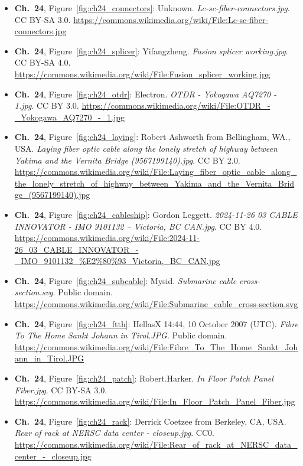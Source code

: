 \begin{small}
\begin{itemize}[leftmargin=0pt,itemsep=2pt,label={}]
\item \textbf{Ch.~24}, Figure~\ref{fig:ch24_connectors}: Unknown. \emph{Lc-\allowbreak{}sc-\allowbreak{}fiber-\allowbreak{}connectors.\allowbreak{}jpg}. CC BY-SA 3.0. \url{https://commons.wikimedia.org/wiki/File:Lc-sc-fiber-connectors.jpg}
\item \textbf{Ch.~24}, Figure~\ref{fig:ch24_splicer}: Yifangzheng. \emph{Fusion splicer working.\allowbreak{}jpg}. CC BY-SA 4.0. \url{https://commons.wikimedia.org/wiki/File:Fusion_splicer_working.jpg}
\item \textbf{Ch.~24}, Figure~\ref{fig:ch24_otdr}: Electron. \emph{OTDR -\allowbreak{} Yokogawa AQ7270 -\allowbreak{} 1.\allowbreak{}jpg}. CC BY 3.0. \url{https://commons.wikimedia.org/wiki/File:OTDR_-_Yokogawa_AQ7270_-_1.jpg}
\item \textbf{Ch.~24}, Figure~\ref{fig:ch24_laying}: Robert Ashworth from Bellingham, WA., USA. \emph{Laying fiber optic cable along the lonely stretch of highway between Yakima and the Vernita Bridge (9567199140).\allowbreak{}jpg}. CC BY 2.0. \url{https://commons.wikimedia.org/wiki/File:Laying_fiber_optic_cable_along_the_lonely_stretch_of_highway_between_Yakima_and_the_Vernita_Bridge_(9567199140).jpg}
\item \textbf{Ch.~24}, Figure~\ref{fig:ch24_cableship}: Gordon Leggett. \emph{2024-\allowbreak{}11-\allowbreak{}26 03 CABLE INNOVATOR -\allowbreak{} IMO 9101132 – Victoria, BC CAN.\allowbreak{}jpg}. CC BY 4.0. \url{https://commons.wikimedia.org/wiki/File:2024-11-26_03_CABLE_INNOVATOR_-_IMO_9101132_%E2%80%93_Victoria,_BC_CAN.jpg}
\item \textbf{Ch.~24}, Figure~\ref{fig:ch24_subcable}: Mysid. \emph{Submarine cable cross-\allowbreak{}section.\allowbreak{}svg}. Public domain. \url{https://commons.wikimedia.org/wiki/File:Submarine_cable_cross-section.svg}
\item \textbf{Ch.~24}, Figure~\ref{fig:ch24_ftth}: HellasX 14:44, 10 October 2007 (UTC). \emph{Fibre To The Home Sankt Johann in Tirol.\allowbreak{}JPG}. Public domain. \url{https://commons.wikimedia.org/wiki/File:Fibre_To_The_Home_Sankt_Johann_in_Tirol.JPG}
\item \textbf{Ch.~24}, Figure~\ref{fig:ch24_patch}: Robert.Harker. \emph{In Floor Patch Panel Fiber.\allowbreak{}jpg}. CC BY-SA 3.0. \url{https://commons.wikimedia.org/wiki/File:In_Floor_Patch_Panel_Fiber.jpg}
\item \textbf{Ch.~24}, Figure~\ref{fig:ch24_rack}: Derrick Coetzee from Berkeley, CA, USA. \emph{Rear of rack at NERSC data center -\allowbreak{} closeup.\allowbreak{}jpg}. CC0. \url{https://commons.wikimedia.org/wiki/File:Rear_of_rack_at_NERSC_data_center_-_closeup.jpg}

\end{itemize}
\end{small}
